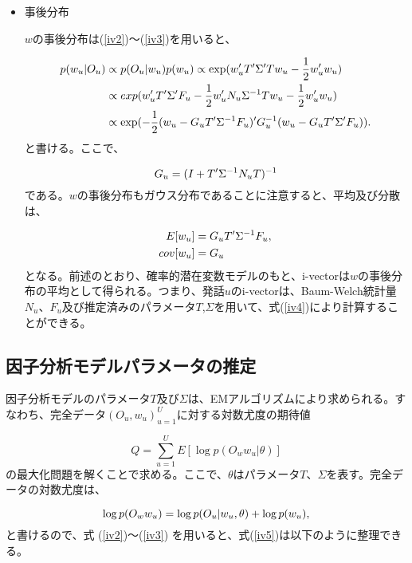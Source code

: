 \begin{itemize}
\item 事後分布\par
$w$の事後分布は(\ref{iv2})〜(\ref{iv3})を用いると、

\begin{align}
p(w_u|O_u) &\propto p(O_u|w_u)p(w_u)\propto \exp(w_u^\prime T^\prime \Sigma^\prime Tw_u-\frac{1}{2}w_u^\prime w_u) \notag \\ 
 &\propto exp(w_u^\prime T^\prime \Sigma^\prime F_u-\frac{1}{2}w_u^\prime N_u\Sigma^{-1}Tw_u-\frac{1}{2}w_u^\prime w_u) \notag \\ 
 &\propto \exp(-\frac{1}{2}(w_u-G_uT^\prime\Sigma^{-1}F_u)^\prime G_u^{-1}(w_u-G_uT^\prime \Sigma^\prime F_u)). \notag
\end{align}
と書ける。ここで、

\begin{equation}
G_u=(I+T^\prime \Sigma^{-1}N_u T)^{-1} \notag
\end{equation}
である。$w$の事後分布もガウス分布であることに注意すると、平均及び分散は、

\begin{align}
\label{iv4}
E[w_u] &=G_uT^\prime \Sigma^{-1}F_u, \\
cov[w_u] &=G_u \notag
\end{align}
となる。前述のとおり、確率的潜在変数モデルのもと、i-vectorは$w$の事後分布の平均として得られる。つまり、発話$u$のi-vectorは、Baum-Welch統計量$N_u$、$F_u$及び推定済みのパラメータ$T$,$\Sigma$を用いて、式(\ref{iv4})により計算することができる。

\end{itemize}


\subsection{因子分析モデルパラメータの推定}
因子分析モデルのパラメータ$T$及び$\Sigma$は、EMアルゴリズムにより求められる。すなわち、完全データ${(O_u,w_u)}_{u=1}^{U}$に対する対数尤度の期待値

\begin{equation}
\label{iv5}
Q=\sum_{u=1}^{U}E[\log p(O_ww_u|\theta)]
\end{equation}
の最大化問題を解くことで求める。ここで、$\theta$はパラメータ$T$、$\Sigma$を表す。完全データの対数尤度は、

\begin{equation}
\log p(O_w w_u)=\log p(O_u|w_u,\theta)+\log p(w_u), \notag
\end{equation}
と書けるので、式 (\ref{iv2})〜(\ref{iv3}) を用いると、式(\ref{iv5})は以下のように整理できる。

